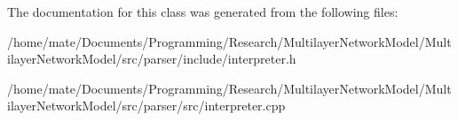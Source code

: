 The documentation for this class was generated from the following files\+:\begin{DoxyCompactItemize}
\item 
/home/mate/\+Documents/\+Programming/\+Research/\+Multilayer\+Network\+Model/\+Multilayer\+Network\+Model/src/parser/include/interpreter.\+h\item 
/home/mate/\+Documents/\+Programming/\+Research/\+Multilayer\+Network\+Model/\+Multilayer\+Network\+Model/src/parser/src/interpreter.\+cpp\end{DoxyCompactItemize}
